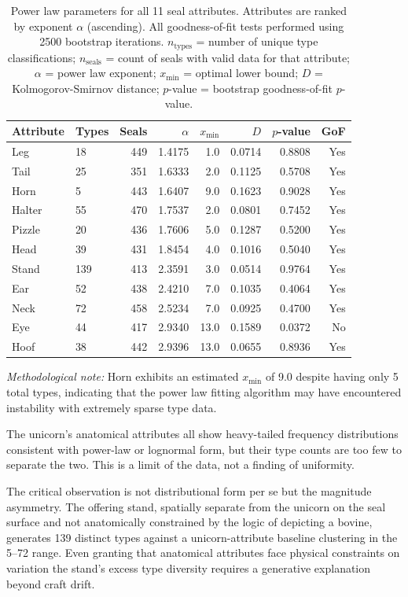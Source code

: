 \documentclass[12pt]{article}
\begin{document}
\begin{table}[H]
\centering
\caption{Power law parameters for all 11 seal attributes. Attributes are ranked by exponent $\alpha$ (ascending). 
All goodness-of-fit tests performed using 2500 bootstrap iterations. 
$n_{\text{types}}$ = number of unique type classifications; 
$n_{\text{seals}}$ = count of seals with valid data for that attribute; 
$\alpha$ = power law exponent; 
$x_{\min}$ = optimal lower bound; 
$D$ = Kolmogorov-Smirnov distance; 
$p$-value = bootstrap goodness-of-fit $p$-value.}
\label{tab:all_attributes}
\begin{tabular}{@{}llrrrrrr@{}}
\toprule
Attribute & Types & Seals & $\alpha$ & $x_{\min}$ & $D$ & $p$-value & GoF \\
\midrule
Leg & 18 & 449 & 1.4175 & 1.0 & 0.0714 & 0.8808 & Yes \\
Tail & 25 & 351 & 1.6333 & 2.0 & 0.1125 & 0.5708 & Yes \\
Horn & 5 & 443 & 1.6407 & 9.0 & 0.1623 & 0.9028 & Yes \\
Halter & 55 & 470 & 1.7537 & 2.0 & 0.0801 & 0.7452 & Yes \\
Pizzle & 20 & 436 & 1.7606 & 5.0 & 0.1287 & 0.5200 & Yes \\
Head & 39 & 431 & 1.8454 & 4.0 & 0.1016 & 0.5040 & Yes \\
Stand & 139 & 413 & 2.3591 & 3.0 & 0.0514 & 0.9764 & Yes \\
Ear & 52 & 438 & 2.4210 & 7.0 & 0.1035 & 0.4064 & Yes \\
Neck & 72 & 458 & 2.5234 & 7.0 & 0.0925 & 0.4700 & Yes \\
Eye & 44 & 417 & 2.9340 & 13.0 & 0.1589 & 0.0372 & No \\
Hoof & 38 & 442 & 2.9396 & 13.0 & 0.0655 & 0.8936 & Yes \\
\bottomrule
\end{tabular}
\end{table}

\textit{Methodological note:} Horn exhibits an estimated $x_{\min}$ of 9.0
despite having only 5 total types, indicating that the power law fitting
algorithm may have encountered instability with extremely sparse type data.

The unicorn's anatomical attributes all show heavy-tailed frequency
distributions consistent with power-law or lognormal form, but their type counts
are too few to separate the two. This is a limit of the data, not a
finding of uniformity.

The critical observation is not distributional form per se but the magnitude
asymmetry. The offering stand, spatially separate from the unicorn on the seal
surface and not anatomically constrained by the logic of depicting a bovine,
generates 139 distinct types against a unicorn-attribute baseline clustering in
the 5--72 range. Even granting that anatomical attributes face physical constraints
on variation the stand's excess type diversity requires a generative explanation
beyond craft drift.
\end{document}
